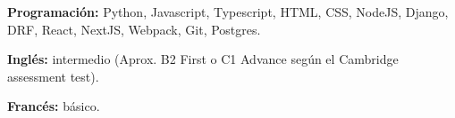 

\begin{cvpubs}

  \cvpub
    {
      \begin{cvlist}
        \item{\textbf{Programación:} Python, Javascript, Typescript, HTML, CSS, NodeJS, Django, DRF, React, NextJS, Webpack, Git, Postgres. }
        \item{\textbf{Inglés:} intermedio (Aprox. B2 First o C1 Advance según el Cambridge assessment test). }
        \item{\textbf{Francés:} básico. }
      \end{cvlist}
    }\vspace{-4pt}
\end{cvpubs}